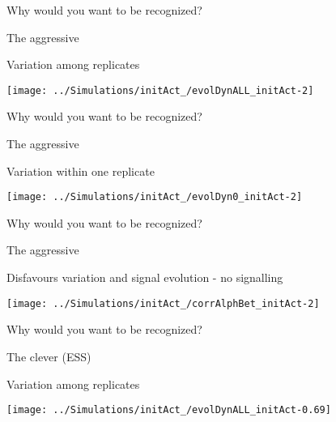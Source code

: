 \documentclass[
  ignorenonframetext,
]{beamer}
\begin{document}
\begin{frame}{Why would you want to be recognized?}
\protect\hypertarget{why-would-you-want-to-be-recognized-5}{}

\begin{block}{The aggressive}

Variation among replicates

\begin{flushleft}\texttt{[image: ../Simulations/initAct\_/evolDynALL\_initAct-2]} \end{flushleft}

\end{block}

\end{frame}

\begin{frame}{Why would you want to be recognized?}
\protect\hypertarget{why-would-you-want-to-be-recognized-6}{}

\begin{block}{The aggressive}

Variation within one replicate

\begin{flushleft}\texttt{[image: ../Simulations/initAct\_/evolDyn0\_initAct-2]} \end{flushleft}

\end{block}

\end{frame}

\begin{frame}{Why would you want to be recognized?}
\protect\hypertarget{why-would-you-want-to-be-recognized-7}{}

\begin{block}{The aggressive}

Disfavours variation and signal evolution - no signalling

\begin{flushleft}\texttt{[image: ../Simulations/initAct\_/corrAlphBet\_initAct-2]} \end{flushleft}

\end{block}

\end{frame}

\begin{frame}{Why would you want to be recognized?}
\protect\hypertarget{why-would-you-want-to-be-recognized-8}{}

\begin{block}{The clever (ESS)}

Variation among replicates

\begin{flushleft}\texttt{[image: ../Simulations/initAct\_/evolDynALL\_initAct-0.69]} \end{flushleft}

\end{block}

\end{frame}
\end{document}
